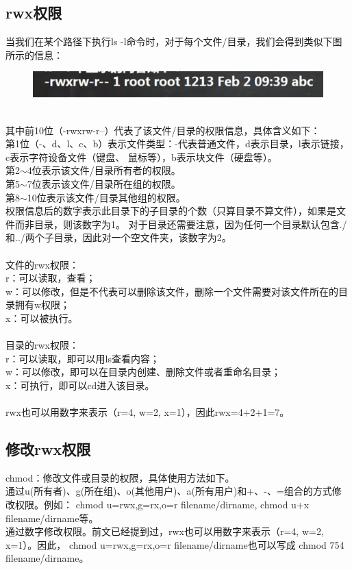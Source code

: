 \documentclass[11pt]{article}
\begin{document}
\subsection{rwx权限}
 当我们在某个路径下执行ls -l命令时，对于每个文件/目录，我们会得到类似下图所示的信息：
\begin{figure}[htb]
    \centering
    \includegraphics[scale=0.4]{imgs/rwx_info.png}
\end{figure}  \\
其中前10位（-rwxrw-r--）代表了该文件/目录的权限信息，具体含义如下：  \\
第1位（-、d、l、c、b）表示文件类型：-代表普通文件，d表示目录，l表示链接，c表示字符设备文件（键盘、
鼠标等），b表示块文件（硬盘等）。  \\
第2$\sim$4位表示该文件/目录所有者的权限。  \\
第5$\sim$7位表示该文件/目录所在组的权限。  \\
第8$\sim$10位表示该文件/目录其他组的权限。  \\
权限信息后的数字表示此目录下的子目录的个数（只算目录不算文件），如果是文件而非目录，则该数字为1。
对于目录还需要注意，因为任何一个目录默认包含./和../两个子目录，因此对一个空文件夹，该数字为2。\\\\
 文件的rwx权限：  \\
r：可以读取，查看；  \\
w：可以修改，但是不代表可以删除该文件，删除一个文件需要对该文件所在的目录拥有w权限；  \\
x：可以被执行。  \\\\
 目录的rwx权限：  \\
r：可以读取，即可以用ls查看内容；  \\
w：可以修改，即可以在目录内创建、删除文件或者重命名目录；  \\
x：可执行，即可以cd进入该目录。 \\\\
 rwx也可以用数字来表示（r=4, w=2, x=1），因此rwx=4+2+1=7。

\subsection{修改rwx权限}
chmod：修改文件或目录的权限，具体使用方法如下。  \\
 通过u(所有者)、g(所在组)、o(其他用户)、a(所有用户)和+、-、=组合的方式修改权限。例如：
chmod u=rwx,g=rx,o=r filename/dirname, \quad chmod u+x filename/dirname等。\\
 通过数字修改权限。前文已经提到过，rwx也可以用数字来表示（r=4, w=2, x=1）。因此，
chmod u=rwx,g=rx,o=r filename/dirname也可以写成 chmod 754 filename/dirname。
\end{document}
